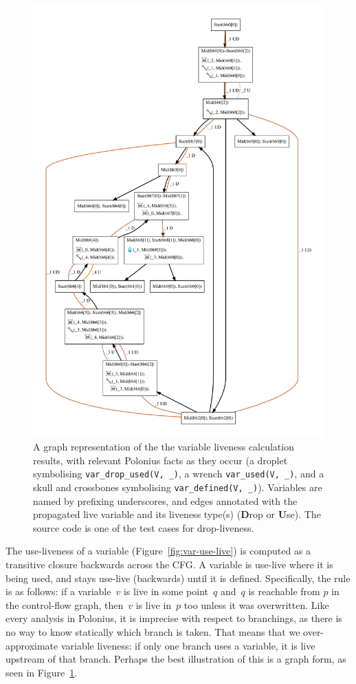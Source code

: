 \documentclass[11pt,a4paper,twoside,openany,draft]{report}
\newcommand{\InDatalog}[1]{\texttt{#1}}
\begin{document}
\begin{figure}
  \includegraphics[width=0.9\linewidth]{Graphs/liveness.pdf}
  \caption[MIR Fragment with Inputs and Outputs of the Liveness Analysis]{A
    graph representation of the the variable liveness calculation results, with
    relevant Polonius facts as they occur (a droplet symbolising
    \InDatalog{var_drop_used(V, _)}, a wrench \InDatalog{var_used(V, _)}, and a
    skull and crossbones symbolising \InDatalog{var_defined(V, _)}). Variables
    are named by prefixing underscores, and edges annotated with the propagated
    live variable and its liveness type(s) (\textbf{D}rop or \textbf{U}se). The
    source code is one of the test cases for drop-liveness.}\label{fig:liveness-graph}
\end{figure}

The use-liveness of a variable (Figure~\ref{fig:var-use-live}) is computed as a
transitive closure backwards across the CFG\@. A variable is use-live where it is
being used, and stays use-live (backwards) until it is defined. Specifically,
the rule is as follows: if a variable~$v$ is live in some point~$q$ and~$q$ is
reachable from $p$ in the control-flow graph, then~$v$ is live in~$p$ too unless
it was overwritten. Like every analysis in Polonius, it is imprecise with
respect to branchings, as there is no way to know statically which branch is
taken. That means that we over-approximate variable liveness: if only one branch
uses a variable, it is live upstream of that branch. Perhaps the best
illustration of this is a graph form, as seen in
Figure~\ref{fig:liveness-graph}.
\end{document}
